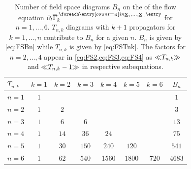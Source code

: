 \begin{table}[t]
	\centering
	\caption{\label{tab:FScombinatorics}%
		Number of field space diagrams $B_n$ on the \rhs{} of the flow equation ${\protect\FSvertexDt{\protect\FSidxE{x}_1,\ldots,\protect\FSidxE{x}_n}}$ for ${n=1,\ldots,6}$.
		$T_{n,k}$ diagrams with $k+1$ propagators for ${k=1,\ldots,n}$ contribute to $B_n$ for a given $n$. $B_n$ is given by \cref{eq:FSBn} while $T_{n,k}$ is given by \cref{eq:FSTnk}.
		The factors for $n=2,\ldots,4$ appear in \cref{eq:FS2,eq:FS3,eq:FS4} as $\skeleton{T_{n,k}}$ and $\skeleton{T_{n,k}-1}$ in respective subequations.
	}%
	\vspace{\TableAbovecaptionskip}
	\renewcommand{\arraystretch}{1.15}
	\begin{tabular}{l | c  c c c c c || c}
		\toprule
		$T_{n,k} $& $k=1$ & $k=2$ & $k=3$ & $k=4$ & $k=5$ & $k=6$ & $B_n$ \\\midrule
		$n=1$ & $1$ & 	 & 	 & 	 & 	 & 	 & $1$ \\
		$n=2$ & $1$ & $2$ & 	 & 	 & 	 & 	 & $3$ \\
		$n=3$ & $1$ & $6$ & $6$ & 	 & 	 & 	 & $13$ \\
		$n=4$ & $1$ & $14$ & $36$ & $24$ & 	 & 	 & $75$ \\
		$n=5$ & $1$ & $30$ & $150$ & $240$ & $120$ & 	 & $541$ \\
		$n=6$ & $1$ & $62$ & $540$ & $1560$ & $1800$ & $720$ & $4683$ \\
		\bottomrule
	\end{tabular}
\end{table}

